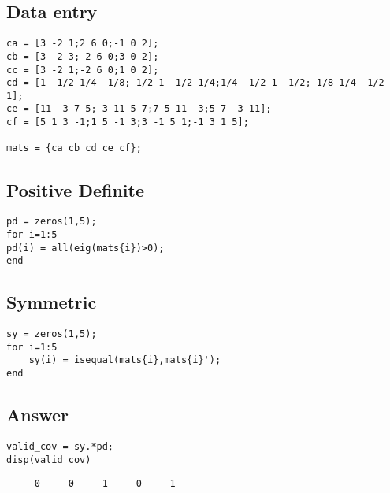 \documentclass[12pt]{article}
\begin{document}
\subsection*{Data entry}

\begin{verbatim}
ca = [3 -2 1;2 6 0;-1 0 2];
cb = [3 -2 3;-2 6 0;3 0 2];
cc = [3 -2 1;-2 6 0;1 0 2];
cd = [1 -1/2 1/4 -1/8;-1/2 1 -1/2 1/4;1/4 -1/2 1 -1/2;-1/8 1/4 -1/2 1];
ce = [11 -3 7 5;-3 11 5 7;7 5 11 -3;5 7 -3 11];
cf = [5 1 3 -1;1 5 -1 3;3 -1 5 1;-1 3 1 5];

mats = {ca cb cd ce cf};
\end{verbatim}


\subsection*{Positive Definite}

\begin{verbatim}
pd = zeros(1,5);
for i=1:5
pd(i) = all(eig(mats{i})>0);
end
\end{verbatim}


\subsection*{Symmetric}

\begin{verbatim}
sy = zeros(1,5);
for i=1:5
    sy(i) = isequal(mats{i},mats{i}');
end
\end{verbatim}


\subsection*{Answer}

\begin{verbatim}
valid_cov = sy.*pd;
disp(valid_cov)
\end{verbatim}

        \color{lightgray} \begin{verbatim}     0     0     1     0     1

\end{verbatim} \color{black}
    
\end{document}
